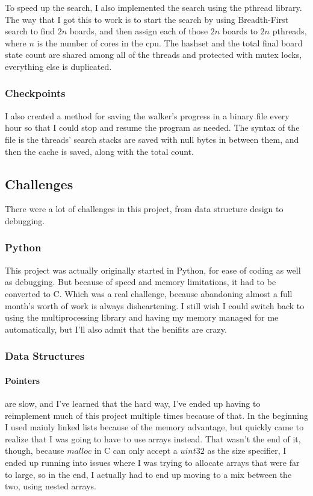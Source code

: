 \documentclass{article}
\begin{document}
To speed up the search, I also implemented the search using the pthread library. The way that I got this to work is to start the search by using Breadth-First search to find $2n$ boards, and then assign each of those $2n$ boards to $2n$ pthreads, where $n$ is the number of cores in the cpu. The hashset and the total final board state count are shared among all of the threads and protected with mutex locks, everything else is duplicated.

\subsubsection{Checkpoints}

I also created a method for saving the walker's progress in a binary file every hour so that I could stop and resume the program as needed. The syntax of the file is the threads' search stacks are saved with null bytes in between them, and then the cache is saved, along with the total count.

\subsection{Challenges}

There were a lot of challenges in this project, from data structure design to debugging.

\subsubsection{Python}

This project was actually originally started in Python, for ease of coding as well as debugging. But because of speed and memory limitations, it had to be converted to C. Which was a real challenge, because abandoning almost a full month's worth of work is always disheartening. I still wish I could switch back to using the multiprocessing library and having my memory managed for me automatically, but I'll also admit that the benifits are crazy.

\subsubsection{Data Structures}

\paragraph{Pointers} are slow, and I've learned that the hard way, I've ended up having to reimplement much of this project multiple times because of that. In the beginning I used mainly linked lists because of the memory advantage, but quickly came to realize that I was going to have to use arrays instead. That wasn't the end of it, though, because $malloc$ in C can only accept a $uint32$ as the size specifier, I ended up running into issues where I was trying to allocate arrays that were far to large, so in the end, I actually had to end up moving to a mix between the two, using nested arrays.
\end{document}
